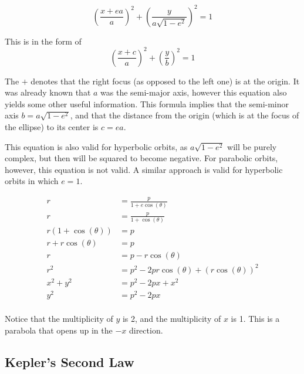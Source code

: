 \documentclass[../basicOrbitalDynamics.tex]{subfiles}
\begin{document}
\begin{equation}\label{Orbit Cartesian}
    \left(\frac{x+ea}{a}\right)^2+\left(\frac{y}{a\sqrt{1-e^2}}\right)^2=1
\end{equation}

This is in the form of
\[\left(\frac{x+c}{a}\right)^2+\left(\frac{y}{b}\right)^2=1\]

The $+$ denotes that the right focus (as opposed to the left one) is at the origin. It was already known that $a$ was the semi-major axis, however this equation also yields some other useful information. This formula implies that the semi-minor axis $b=a\sqrt{1-e^2}$, and that the distance from the origin (which is at the focus of the ellipse) to its center is $c=ea$.

This equation is also valid for hyperbolic orbits, as $a\sqrt{1-e^2}$ will be purely complex, but then will be squared to become negative. For parabolic orbits, however, this equation is not valid. A similar approach is valid for hyperbolic orbits in which $e=1$.

\begin{align*}
    r                 & =\frac{p}{1+e\cos(\theta)}              \\
    r                 & =\frac{p}{1+\cos(\theta)}               \\
    r(1+\cos(\theta)) & = p                                     \\
    r+r\cos(\theta)   & = p                                     \\
    r                 & = p-r\cos(\theta)                       \\
    r^2               & = p^2-2pr\cos(\theta)+(r\cos(\theta))^2 \\
    x^2+y^2           & = p^2-2px+x^2                           \\
    y^2               & = p^2-2px                               \\
\end{align*}

Notice that the multiplicity of $y$ is 2, and the multiplicity of $x$ is 1. This is a parabola that opens up in the $-x$ direction.

\bigskip\bigskip
\subsection{Kepler's Second Law}\label{sec:Kepler's Second Law}
\end{document}
